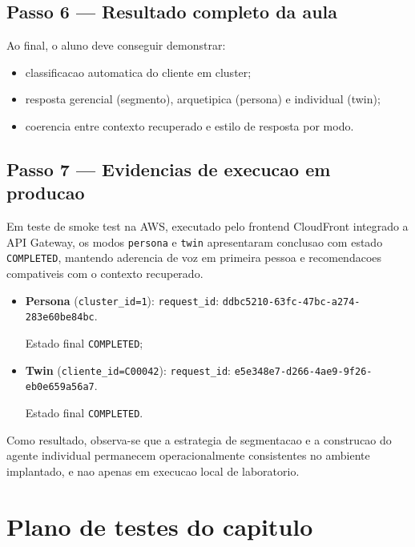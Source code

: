 \subsection{Passo 6 --- Resultado completo da aula}

Ao final, o aluno deve conseguir demonstrar:

\begin{itemize}[leftmargin=*]
  \item classificacao automatica do cliente em cluster;
  \item resposta gerencial (segmento), arquetipica (persona) e individual (twin);
  \item coerencia entre contexto recuperado e estilo de resposta por modo.
\end{itemize}

\subsection{Passo 7 --- Evidencias de execucao em producao}

Em teste de smoke test na AWS, executado pelo frontend CloudFront integrado a
API Gateway, os modos \texttt{persona} e \texttt{twin} apresentaram
conclusao com estado \texttt{COMPLETED}, mantendo aderencia de voz em primeira
pessoa e recomendacoes compativeis com o contexto recuperado.

\begin{itemize}[leftmargin=*]
  \item \textbf{Persona} (\texttt{cluster\_id=1}):
        \texttt{request\_id}: \nolinkurl{ddbc5210-63fc-47bc-a274-283e60be84bc}. \par
        Estado final \texttt{COMPLETED};
  \item \textbf{Twin} (\texttt{cliente\_id=C00042}):
        \texttt{request\_id}: \nolinkurl{e5e348e7-d266-4ae9-9f26-eb0e659a56a7}. \par
        Estado final \texttt{COMPLETED}.
\end{itemize}

Como resultado, observa-se que a estrategia de segmentacao e a construcao do
agente individual permanecem operacionalmente consistentes no ambiente
implantado, e nao apenas em execucao local de laboratorio.

\section{Plano de testes do capitulo}

